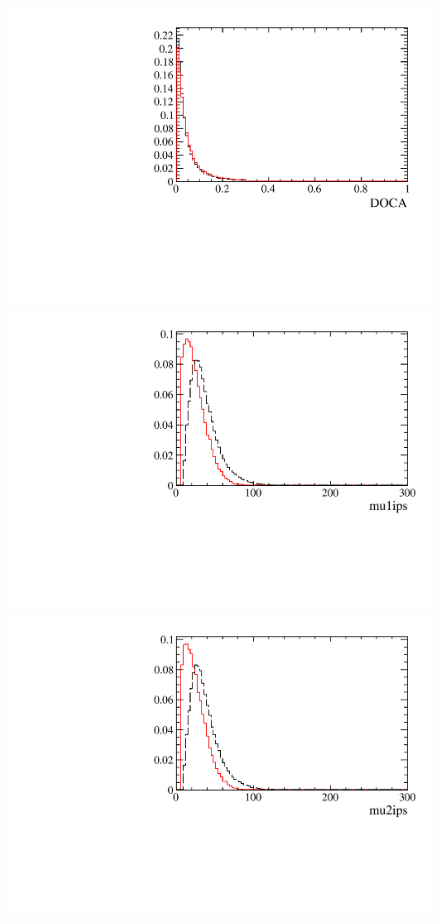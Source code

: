 \begin{figure} [htb!]
\begin{center}
\includegraphics[scale=0.20]{figs/DOCAFULL2pipi.pdf}
\includegraphics[scale=0.20]{figs/mu1ipsFULL2pipi.pdf}
\includegraphics[scale=0.20]{figs/mu2ipsFULL2pipi.pdf}

\end{center}
\end{figure}
